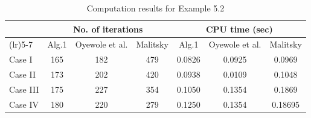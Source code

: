 \documentclass[hidelinks,11 pt]{article}
\numberwithin{equation}{section}
\theoremstyle{definition}  %
\numberwithin{equation}{section}
\numberwithin{theorem}{section}
\begin{document}
\begin{table}[ht]
\centering
\caption{Computation results for Example 5.2}
\renewcommand\arraystretch{1.5}
\begin{tabular}{>{\centering\arraybackslash}m{4.5cm}cccccc}
\toprule
\multirow{2}{*}{} & \multicolumn{3}{c}{No. of iterations} & \multicolumn{3}{c}{CPU time (sec)} \\
\cmidrule(lr){2-4} \cmidrule(lr){5-7}
 & Alg.1 & Oyewole et al. & Malitsky  & Alg.1 & Oyewole et al. & Malitsky \\
\midrule
Case I& 165 & 182 & 479 & 0.0826 & 0.0925 & 0.0969 \\
Case II & 173 & 202 & 420 & 0.0938 & 0.0109 & 0.1048 \\
Case III& 175 & 227 & 354 & 0.1050 & 0.1354 & 0.1869 \\
Case IV & 180 & 220 & 279 & 0.1250 & 0.1354 & 0.18695 \\
\bottomrule
\end{tabular}
\label{Table-1}
\end{table}
\end{document}
